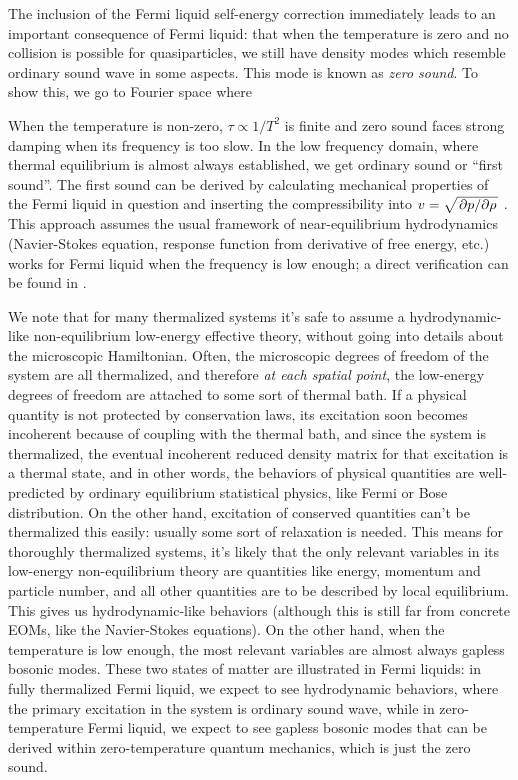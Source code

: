 \documentclass[hyperref, a4paper]{article}
\begin{document}
The inclusion of the Fermi liquid self-energy correction 
immediately leads to an important consequence 
of Fermi liquid: 
that when the temperature is zero and 
no collision is possible for quasiparticles, 
we still have density modes which resemble 
ordinary sound wave in some aspects. 
This mode is known as \emph{zero sound}.
To show this, we go to Fourier space where 

When the temperature is non-zero,
$\tau \propto 1 / T^2$ is finite 
and zero sound faces strong damping 
when its frequency is too slow.
In the low frequency domain, 
where thermal equilibrium is almost always established,
we get ordinary sound or ``first sound''.
The first sound can be derived 
by calculating mechanical properties of the Fermi liquid in question 
and inserting the compressibility 
into $v = \sqrt{\pdv*{p}{\rho}}$ \cite{lifshitz2013statistical}.
This approach assumes the usual framework of near-equilibrium hydrodynamics 
(Navier-Stokes equation, response function from derivative of free energy, etc.)
works for Fermi liquid when the frequency is low enough; 
a direct verification can be found in \cite{belitz2022soft}.

We note that for many thermalized systems it's safe to assume 
a hydrodynamic-like non-equilibrium low-energy effective theory,
without going into details about the microscopic Hamiltonian.
Often, the microscopic degrees of freedom of the system are all thermalized,
and therefore \emph{at each spatial point},
the low-energy degrees of freedom are attached to some sort of thermal bath.
If a physical quantity is not protected by conservation laws,
its excitation soon becomes incoherent because of coupling with the thermal bath,
and since the system is thermalized,
the eventual incoherent reduced density matrix for that excitation is a thermal state,
and in other words, the behaviors of physical quantities are well-predicted 
by ordinary equilibrium statistical physics,
like Fermi or Bose distribution.
On the other hand, excitation of conserved quantities can't be thermalized this easily:
usually some sort of relaxation is needed.
This means for thoroughly thermalized systems,
it's likely that the only relevant variables in its low-energy non-equilibrium theory 
are quantities like energy, momentum and particle number,
and all other quantities are to be described by local equilibrium.
This gives us hydrodynamic-like behaviors 
(although this is still far from concrete EOMs, like the Navier-Stokes equations).
On the other hand, when the temperature is low enough,
the most relevant variables are almost always gapless bosonic modes.
These two states of matter are illustrated in Fermi liquids:
in fully thermalized Fermi liquid, we expect to see hydrodynamic behaviors,
where the primary excitation in the system is ordinary sound wave,
while in zero-temperature Fermi liquid,
we expect to see gapless bosonic modes that can be derived within zero-temperature quantum mechanics,
which is just the zero sound.
\end{document}
